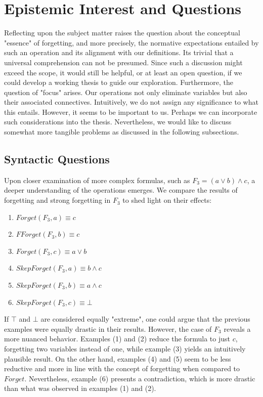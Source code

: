 \documentclass[f,proposal,palatino]{AIGpaper}
\begin{document}
\section{Epistemic Interest and Questions}
Reflecting upon the subject matter raises the question about the conceptual "essence" of forgetting, and more precisely, the normative expectations entailed by such an operation and its alignment with our definitions. 
Its trivial that a universal comprehension can not be presumed. Since such a discussion might exceed the scope, it would still be helpful, or at least an open question, if we could develop a working thesis to guide our exploration. 
Furthermore, the question of "focus" arises. Our operations not only eliminate variables but also their associated connectives. Intuitively, we do not assign any significance to what this entails. However, it seems to be important to us. Perhaps we can incorporate such considerations into the thesis. Nevertheless, we would like to discuss somewhat more tangible problems as discussed in the following subsections. 

\subsection{Syntactic Questions}
Upon closer examination of more complex formulas, such as $F_3 = (a \lor b) \land c$, a deeper understanding of the operations emerges. We compare the results of forgetting and strong forgetting in $F_3$ to shed light on their effects:

\begin{enumerate}[label=(\arabic*)]
    \item $\mathit{Forget(F_3,a)} \equiv c$
    \item $F\mathit{Forget(F_3,b)} \equiv c$
    \item $\mathit{Forget(F_3,c)} \equiv a \lor b$
    \item $\mathit{SkepForget(F_3,a)} \equiv b \land c$
    \item $\mathit{SkepForget(F_3,b)} \equiv a \land c$
    \item $\mathit{SkepForget(F_3,c)} \equiv \bot$
\end{enumerate}

\noindent If $\top$ and $\bot$ are considered equally "extreme", one could argue that the previous examples were equally drastic in their results. However, the case of $F_3$ reveals a more nuanced behavior. Examples (1) and (2) reduce the formula to just $c$, forgetting two variables instead of one, while example (3) yields an intuitively plausible result. On the other hand, examples (4) and (5) seem to be less reductive and more in line with the concept of forgetting when compared to $\mathit{Forget}$. Nevertheless, example (6) presents a contradiction, which is more drastic than what was observed in examples (1) and (2).
\end{document}
